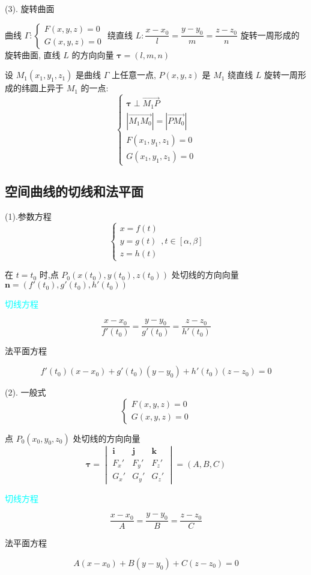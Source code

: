 \begin{definition}[空间曲面]
	(3). 旋转曲面

	曲线 $\Gamma : \begin{cases}
	  F(x,y,z) = 0\\
	  G(x,y,z) = 0
	\end{cases}$ 绕直线 $L: \dfrac{x-x_{0}}{l} = \dfrac{y-y_{0}}{m} = \dfrac{z-z_{0}}{n}$ 旋转一周形成的旋转曲面, 直线 $L$ 的方向向量 
	$\boldsymbol{\tau} = (l,m,n)$

	设 $M_{1}(x_{1},y_{1},z_{1})$ 是曲线 $\Gamma$ 上任意一点, $P(x,y,z)$ 是 $M_{1}$ 绕直线 $L$ 旋转一周形成的纬圆上异于 $M_{1}$ 的一点:
	$$\begin{cases}
	  \boldsymbol{\tau} \perp \overrightarrow{M_{1}P} \\
	  |\overrightarrow{M_{1}M_{0}}| = |\overrightarrow{PM_{0}}|\\
	  F(x_{1},y_{1},z_{1}) = 0\\
	  G(x_{1},y_{1},z_{1}) = 0
	\end{cases}$$
\end{definition}
\subsection{空间曲线的切线和法平面}
\begin{definition}[曲线切线和法平面]
	
	(1).参数方程
	$$\begin{cases}
		x = f(t)\\
		y = g(t)\\
		z = h(t)
	\end{cases}, t \in [\alpha,\beta]$$
	
	在 $t=t_{0}$ 时,点 $P_{0}(x(t_{0}),y(t_{0}),z(t_{0}))$ 处切线的方向向量 $\boldsymbol{n}=(f'(t_{0}),g'(t_{0}),h'(t_{0}))$
	
	\textcolor{cyan}{切线方程}
	
	$$\dfrac{x-x_{0}}{f'(t_{0})}=\dfrac{y-y_{0}}{g'(t_{0})}=\dfrac{z-z_{0}}{h'(t_{0})}$$
	
	\textcolor{purplea}{法平面方程}
	
	$$f'(t_{0})(x-x_{0})+g'(t_{0})(y-y_{0})+h'(t_{0})(z-z_{0})=0$$
	
	(2). 一般式
	$$\begin{cases}
		F(x,y,z) = 0\\
		G(x,y,z) = 0
	\end{cases}$$
	
	点 $P_{0}(x_{0},y_{0},z_{0})$ 处切线的方向向量
	$$\boldsymbol{\tau} = 
	\begin{vmatrix}
	  \boldsymbol{i} & \boldsymbol{j} & \boldsymbol{k}\\
	  F_{x}' & F_{y}' & F_{z}'\\
	  G_{x}' & G_{y}' & G_{z}'
	\end{vmatrix} = (A,B,C)$$

	
	\textcolor{cyan}{切线方程}
	
	$$\dfrac{x-x_{0}}{A} = \dfrac{y-y_{0}}{B} = \dfrac{z-z_{0}}{C}$$
	
	\textcolor{purplea}{法平面方程}
	
	$$A(x-x_{0}) + B(y-y_{0}) + C(z-z_{0}) = 0$$
	
	
\end{definition}

